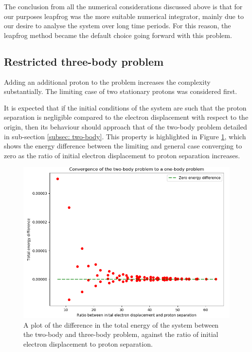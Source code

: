 \documentclass[12pt]{article} %
\numberwithin{equation}{subsection} %
\begin{document}
The conclusion from all the numerical considerations discussed above is that for our purposes leapfrog was the more suitable numerical integrator, mainly due to our desire to analyse the system over long time periods. For this reason, the leapfrog method became the default choice going forward with this problem. \par

\subsection{Restricted three-body problem} \label{subsec: restricted three-body}
Adding an additional proton to the problem increases the complexity substantially. The limiting case of two stationary protons was considered first. \par
It is expected that if the initial conditions of the system are such that the proton separation is negligible compared to the electron displacement with respect to the origin, then its behaviour should approach that of the two-body problem detailed in sub-section \ref{subsec: two-body}. This property is highlighted in Figure \ref{fig: two-body convergence}, which shows the energy difference between the limiting and general case converging to zero as the ratio of initial electron displacement to proton separation increases. \par
\begin{figure}[h]
    \centering
    \captionsetup{justification=centering}
	\includegraphics[scale=0.4]{images/twoBodyConvergence3.png}
	\caption{A plot of the difference in the total energy of the system between the two-body and three-body problem, against the ratio of initial electron displacement to proton separation.}
	\label{fig: two-body convergence}
	\end{figure}
\end{document}
